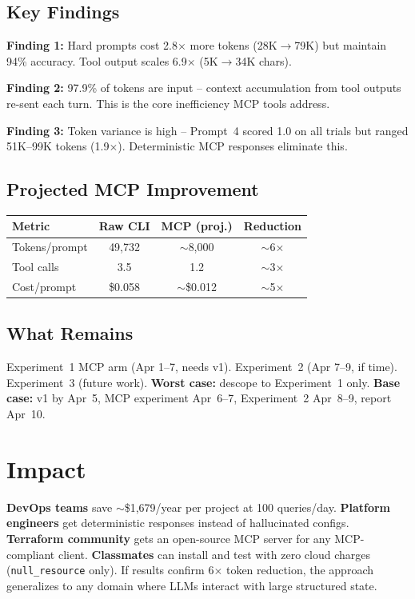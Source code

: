 \documentclass[10pt,twocolumn]{article}
\begin{document}
\subsection{Key Findings}

\textbf{Finding 1:} Hard prompts cost 2.8$\times$ more tokens (28K$\to$79K) but maintain 94\% accuracy. Tool output scales 6.9$\times$ (5K$\to$34K chars).

\textbf{Finding 2:} 97.9\% of tokens are input -- context accumulation from tool outputs re-sent each turn. This is the core inefficiency MCP tools address.

\textbf{Finding 3:} Token variance is high -- Prompt~4 scored 1.0 on all trials but ranged 51K--99K tokens (1.9$\times$). Deterministic MCP responses eliminate this.

\subsection{Projected MCP Improvement}

\begin{table}[h]
\centering\small
\begin{tabular}{lccc}
\toprule
\textbf{Metric} & \textbf{Raw CLI} & \textbf{MCP (proj.)} & \textbf{Reduction} \\
\midrule
Tokens/prompt & 49,732 & $\sim$8,000 & $\sim$6$\times$ \\
Tool calls & 3.5 & 1.2 & $\sim$3$\times$ \\
Cost/prompt & \$0.058 & $\sim$\$0.012 & $\sim$5$\times$ \\
\bottomrule
\end{tabular}
\end{table}

\subsection{What Remains}

Experiment~1 MCP arm (Apr 1--7, needs v1). Experiment~2 (Apr 7--9, if time). Experiment~3 (future work). \textbf{Worst case:} descope to Experiment~1 only. \textbf{Base case:} v1 by Apr~5, MCP experiment Apr~6--7, Experiment~2 Apr~8--9, report Apr~10.

\section{Impact}

\textbf{DevOps teams} save $\sim$\$1,679/year per project at 100 queries/day. \textbf{Platform engineers} get deterministic responses instead of hallucinated configs. \textbf{Terraform community} gets an open-source MCP server for any MCP-compliant client. \textbf{Classmates} can install and test with zero cloud charges (\texttt{null\_resource} only). If results confirm 6$\times$ token reduction, the approach generalizes to any domain where LLMs interact with large structured state.
\end{document}
